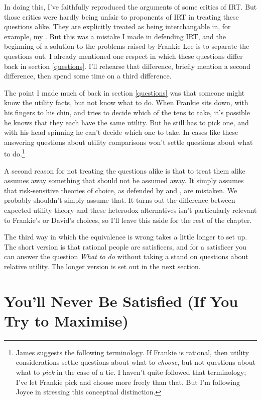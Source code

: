 \documentclass[11pt,]{book}
\let\rmarkdownfootnote\footnote%
\def\footnote{\protect\rmarkdownfootnote}
\begin{document}
In doing this, I've faithfully reproduced the arguments of some critics of IRT. But those critics were hardly being unfair to proponents of IRT in treating these questions alike. They are explicitly treated as being interchangable in, for example, my \citeyearpar{Weatherson2005}. But this was a mistake I made in defending IRT, and the beginning of a solution to the problems raised by Frankie Lee is to separate the questions out. I already mentioned one respect in which these questions differ back in section \ref{questions}. I'll rehearse that difference, briefly mention a second difference, then spend some time on a third difference.

The point I made much of back in section \ref{questions} was that someone might know the utility facts, but not know what to do. When Frankie sits down, with his fingers to his chin, and tries to decide which of the tens to take, it's possible he knows that they each have the same utility. But he still has to pick one, and with his head spinning he can't decide which one to take. In cases like these answering questions about utility comparisons won't settle questions about what to do.\footnote{James \citet{Joyce2018} suggests the following terminology. If Frankie is rational, then utility considerations settle questions about what to \emph{choose}, but not questions about what to \emph{pick} in the case of a tie. I haven't quite followed that terminology; I've let Frankie pick and choose more freely than that. But I'm following Joyce in stressing this conceptual distinction.}

A second reason for not treating the questions alike is that to treat them alike assumes away something that should not be assumed away. It simply assumes that risk-sensitive theories of choice, as defended by \citet{Quiggin1982} and \citet{BuchakRisk}, are mistaken. We probably shouldn't simply assume that. It turns out the difference between expected utility theory and these heterodox alternatives isn't particularly relevant to Frankie's or David's choices, so I'll leave this aside for the rest of the chapter.

The third way in which the equivalence is wrong takes a little longer to set up. The short version is that rational people are satisficers, and for a satisficer you can answer the question \emph{What to do} without taking a stand on questions about relative utility. The longer version is set out in the next section.

\hypertarget{satisfied}{%
\section{You'll Never Be Satisfied (If You Try to Maximise)}\label{satisfied}}
\end{document}
